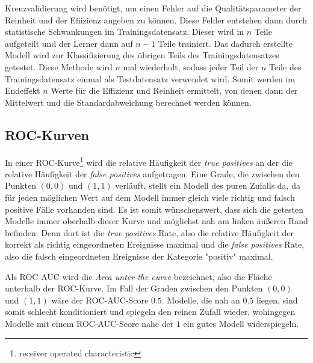 Kreuzvalidierung wird benötigt, um einen Fehler auf die Qualitätsparameter der Reinheit und der Efiizienz angeben zu
können. Diese Fehler entstehen dann durch statistische Schwankungen im Trainingsdatensatz. Dieser wird in $n$ Teile
aufgeteilt und der Lerner dann auf $n-1$ Teile trainiert. Das dadurch erstellte Modell wird zur Klassifizierung des
übrigen Teils des Trainingsdatensatzes getestet. Diese Methode wird $n$ mal wiederholt, sodass jeder Teil der $n$
Teile des Trainingsdatensatz einmal als Testdatensatz verwendet wird. Somit werden im Endeffekt $n$ Werte für die
Effizienz und Reinheit ermittelt, von denen dann der Mittelwert und die Standardabweichung berechnet werden können.

\subsection{ROC-Kurven}

In einer ROC-Kurve\footnote{receiver operated characteristic} wird die relative Häufigkeit der \textit{true positives} an der 
die relative Häufigkeit der
\textit{false positives} aufgetragen. Eine Grade, die zwischen den Punkten
$\left(0,0 \right)$ und $\left(1,1 \right)$ verläuft, stellt ein Modell
des puren Zufalls da, da für jeden möglichen Wert auf dem Modell immer gleich viele
richtig und falsch positive Fälle vorhanden sind. Es ist somit wünschenswert, dass
sich die getesten Modelle immer oberhalb dieser Kurve und möglichst nah am linken
äußeren Rand befinden. Denn dort ist die \textit{true positives} Rate, also
die relative Häufigkeit der korrekt als richtig eingeordneten Ereignisse maximal
und die \textit{false positives} Rate, also die falsch eingeordneten Ereignisse
der Kategorie "positiv" maximal. \par
Als ROC AUC wird die \textit{Area unter the curve} bezeichnet, also die Fläche
unterhalb der ROC-Kurve. Im Fall der Graden zwischen den Punkten $\left(0,0 \right)$ und $\left(1,1 \right)$
wäre der ROC-AUC-Score $0.5$. Modelle, die nah an $0.5$ liegen, sind somit
schlecht konditioniert und spiegeln den reinen Zufall wieder, wohingegen
Modelle mit einem ROC-AUC-Score nahe der $1$ ein gutes Modell widerspiegeln.

